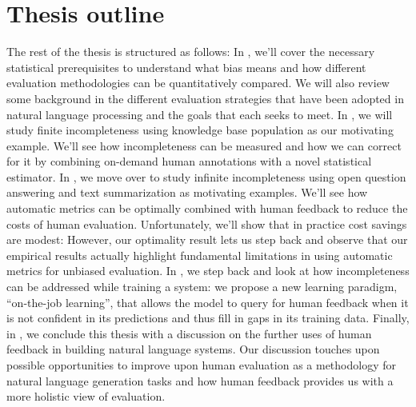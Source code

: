 \section{Thesis outline}
The rest of the thesis is structured as follows:
In , we'll cover the necessary statistical prerequisites to understand what bias means and how different evaluation methodologies can be quantitatively compared.
We will also review some background in the different evaluation strategies that have been adopted in natural language processing and the goals that each seeks to meet.
In , we will study finite incompleteness using knowledge base population as our motivating example.
We'll see how incompleteness can be measured and how we can correct for it by combining on-demand human annotations with a novel statistical estimator.
In , we move over to study infinite incompleteness using open question answering and text summarization as motivating examples.
We'll see how automatic metrics can be optimally combined with human feedback to reduce the costs of human evaluation.
Unfortunately, we'll show that in practice cost savings are modest: 
However, our optimality result lets us step back and observe that our empirical results actually highlight fundamental limitations in using automatic metrics for unbiased evaluation. 
In , we step back and look at how incompleteness can be addressed while training a system: we propose a new learning paradigm, ``on-the-job learning'', that allows the model to query for human feedback when it is not confident in its predictions and thus fill in gaps in its training data.
Finally, in , we conclude this thesis with a discussion on the further uses of human feedback in building natural language systems.
Our discussion touches upon possible opportunities to improve upon human evaluation as a methodology for natural language generation tasks and how human feedback provides us with a more holistic view of evaluation.
